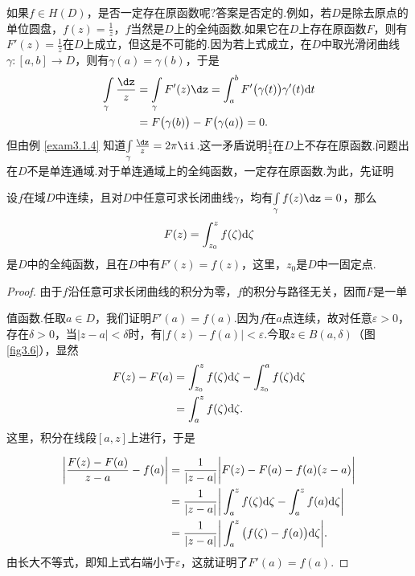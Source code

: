 如果$f\in H(D)$，是否一定存在原函数呢?答案是否定的.例如，若$D$是除去原点的单位圆盘，$f(z)=\frac1z$，$f$当然是$D$上的全纯函数.如果它在$D$上存在原函数$F$，则有$F'(z)=\frac1z$在$D$上成立，但这是不可能的.因为若上式成立，在$D$中取光滑闭曲线$\gamma:[a,b]\to D$，则有$\gamma(a)=\gamma(b)$，于是
\begin{align*}
\int\limits_\gamma\frac{\dz}z&=\int\limits_\gamma F'(z)\dz
=\int_a^bF'\big(\gamma(t)\big)\gamma'(t)\textrm dt\\
&=F\big(\gamma(b)\big)-F\big(\gamma(a)\big)=0.
\end{align*}
但由例 \ref{exam3.1.4} 知道$\int\limits_\gamma\frac{\dz}z=2\pi\ii$.这一矛盾说明$\frac1z$在$D$上不存在原函数.问题出在$D$不是单连通域.对于单连通域上的全纯函数，一定存在原函数.为此，先证明
\begin{theorem}\label{thm3.3.2}
设$f$在域$D$中连续，且对$D$中任意可求长闭曲线$\gamma$，均有$\int\limits_\gamma f(z)\dz=0$，那么
\[F(z)=\int_{z_0}^zf(\zeta)\textrm d\zeta\]
是$D$中的全纯函数，且在$D$中有$F'(z)=f(z)$，这里，$z_0$是$D$中一固定点.
\end{theorem}
\begin{proof}
由于$f$沿任意可求长闭曲线的积分为零，$f$的积分与路径无关，因而$F$是一单\\[1mm]
\begin{minipage}[b]{0,7\textwidth}
值函数.任取$a\in D$，我们证明$F'(a)=f(a)$.因为$f$在$a$点连续，故对任意$\varepsilon>0$，存在$\delta>0$，当$|z-a|<\delta$时，有$|f(z)-f(a)|<\varepsilon$.今取$z\in B(a,\delta)$（图 \ref{fig3.6}），显然
\begin{align*}
F(z)-F(a)&=\int_{z_0}^zf(\zeta)\textrm d\zeta-\int_{z_0}^af(\zeta)\textrm d\zeta\\
&=\int_a^zf(\zeta)\textrm d\zeta.
\end{align*}
这里，积分在线段$[a,z]$上进行，于是
\end{minipage}
\begin{minipage}[b]{0.3\textwidth}
\centering
{}
\end{minipage}
\begin{align*}
\bigg|\frac{F(z)-F(a)}{z-a}-f(a)\bigg|
&=\frac1{|z-a|}\bigg|F(z)-F(a)-f(a)(z-a)\bigg|\\
&=\frac1{|z-a|}\bigg|\int_a^zf(\zeta)\textrm d\zeta-\int_a^zf(a)\textrm d\zeta\bigg|\\
&=\frac1{|z-a|}\bigg|\int_a^z\big(f(\zeta)-f(a)\big)\textrm d\zeta\bigg|.
\end{align*}
由长大不等式，即知上式右端小于$\varepsilon$，这就证明了$F'(a)=f(a)$.
\end{proof}

